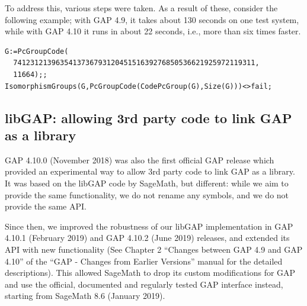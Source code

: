 \documentclass{deliverablereport}
\begin{document}
To address this, various steps were taken.
As a result of these, consider the following 
example; with GAP 4.9, it takes about 130 seconds on one test system, 
while with GAP 4.10 it runs in about 22 seconds, i.e., more than six times faster.

{\small
\begin{verbatim}
G:=PcGroupCode( 
  741231213963541373679312045151639276850536621925972119311,
  11664);;
IsomorphismGroups(G,PcGroupCode(CodePcGroup(G),Size(G)))<>fail;
\end{verbatim}
}


%
%


\subsection{libGAP: allowing 3rd party code to link GAP as a library}\label{libgap}

GAP 4.10.0 (November 2018) was also the first official GAP release
which provided an experimental way to allow 3rd party code to 
link GAP as a library. It was based on the libGAP code by SageMath, 
but different: while we aim to provide the same functionality, 
we do not rename any symbols, and we do not provide the same API. 

Since then, we improved the robustness of our libGAP implementation
in GAP 4.10.1 (February 2019) and GAP 4.10.2 (June 2019) releases,
and extended its API with new functionality (See Chapter 2 
``Changes between GAP 4.9 and GAP 4.10'' of the 
``GAP - Changes from Earlier Versions'' manual for the detailed
descriptions). This allowed SageMath to drop its custom 
modifications for GAP and use the official, documented and regularly 
tested GAP interface instead, starting from SageMath 8.6 (January 2019).
\end{document}
